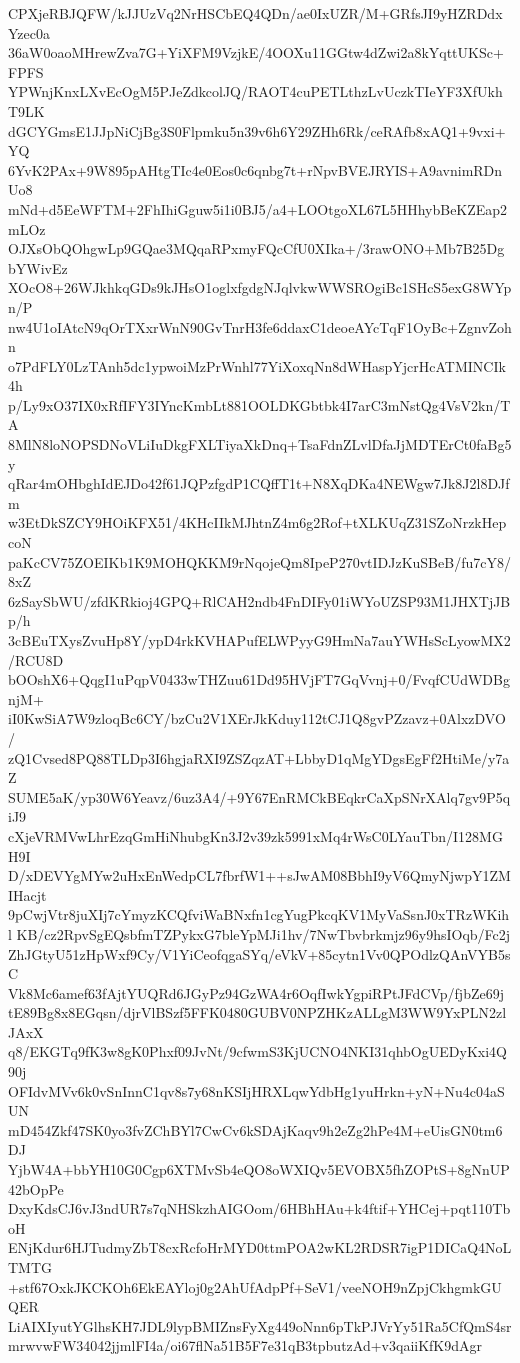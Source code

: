 CPXjeRBJQFW/kJJUzVq2NrHSCbEQ4QDn/ae0IxUZR/M+GRfsJI9yHZRDdxYzec0a
36aW0oaoMHrewZva7G+YiXFM9VzjkE/4OOXu11GGtw4dZwi2a8kYqttUKSc+FPFS
YPWnjKnxLXvEcOgM5PJeZdkcolJQ/RAOT4cuPETLthzLvUczkTIeYF3XfUkhT9LK
dGCYGmsE1JJpNiCjBg3S0Flpmku5n39v6h6Y29ZHh6Rk/ceRAfb8xAQ1+9vxi+YQ
6YvK2PAx+9W895pAHtgTIc4e0Eos0c6qnbg7t+rNpvBVEJRYIS+A9avnimRDnUo8
mNd+d5EeWFTM+2FhIhiGguw5i1i0BJ5/a4+LOOtgoXL67L5HHhybBeKZEap2mLOz
OJXsObQOhgwLp9GQae3MQqaRPxmyFQcCfU0XIka+/3rawONO+Mb7B25DgbYWivEz
XOcO8+26WJkhkqGDs9kJHsO1oglxfgdgNJqlvkwWWSROgiBc1SHcS5exG8WYpn/P
nw4U1oIAtcN9qOrTXxrWnN90GvTnrH3fe6ddaxC1deoeAYcTqF1OyBc+ZgnvZohn
o7PdFLY0LzTAnh5dc1ypwoiMzPrWnhl77YiXoxqNn8dWHaspYjcrHcATMINCIk4h
p/Ly9xO37IX0xRfIFY3IYncKmbLt881OOLDKGbtbk4I7arC3mNstQg4VsV2kn/TA
8MlN8loNOPSDNoVLiIuDkgFXLTiyaXkDnq+TsaFdnZLvlDfaJjMDTErCt0faBg5y
qRar4mOHbghIdEJDo42f61JQPzfgdP1CQffT1t+N8XqDKa4NEWgw7Jk8J2l8DJfm
w3EtDkSZCY9HOiKFX51/4KHcIIkMJhtnZ4m6g2Rof+tXLKUqZ31SZoNrzkHepcoN
paKcCV75ZOEIKb1K9MOHQKKM9rNqojeQm8IpeP270vtIDJzKuSBeB/fu7cY8/8xZ
6zSaySbWU/zfdKRkioj4GPQ+RlCAH2ndb4FnDIFy01iWYoUZSP93M1JHXTjJBp/h
3cBEuTXysZvuHp8Y/ypD4rkKVHAPufELWPyyG9HmNa7auYWHsScLyowMX2/RCU8D
bOOshX6+QqgI1uPqpV0433wTHZuu61Dd95HVjFT7GqVvnj+0/FvqfCUdWDBgnjM+
iI0KwSiA7W9zloqBc6CY/bzCu2V1XErJkKduy112tCJ1Q8gvPZzavz+0AlxzDVO/
zQ1Cvsed8PQ88TLDp3I6hgjaRXI9ZSZqzAT+LbbyD1qMgYDgsEgFf2HtiMe/y7aZ
SUME5aK/yp30W6Yeavz/6uz3A4/+9Y67EnRMCkBEqkrCaXpSNrXAlq7gv9P5qiJ9
cXjeVRMVwLhrEzqGmHiNhubgKn3J2v39zk5991xMq4rWsC0LYauTbn/I128MGH9I
D/xDEVYgMYw2uHxEnWedpCL7fbrfW1++sJwAM08BbhI9yV6QmyNjwpY1ZMIHacjt
9pCwjVtr8juXIj7cYmyzKCQfviWaBNxfn1cgYugPkcqKV1MyVaSsnJ0xTRzWKihl
KB/cz2RpvSgEQsbfmTZPykxG7bleYpMJi1hv/7NwTbvbrkmjz96y9hsIOqb/Fc2j
ZhJGtyU51zHpWxf9Cy/V1YiCeofqgaSYq/eVkV+85cytn1Vv0QPOdlzQAnVYB5sC
Vk8Mc6amef63fAjtYUQRd6JGyPz94GzWA4r6OqfIwkYgpiRPtJFdCVp/fjbZe69j
tE89Bg8x8EGqsn/djrVlBSzf5FFK0480GUBV0NPZHKzALLgM3WW9YxPLN2zlJAxX
q8/EKGTq9fK3w8gK0Phxf09JvNt/9cfwmS3KjUCNO4NKI31qhbOgUEDyKxi4Q90j
OFIdvMVv6k0vSnInnC1qv8s7y68nKSIjHRXLqwYdbHg1yuHrkn+yN+Nu4c04aSUN
mD454Zkf47SK0yo3fvZChBYl7CwCv6kSDAjKaqv9h2eZg2hPe4M+eUisGN0tm6DJ
YjbW4A+bbYH10G0Cgp6XTMvSb4eQO8oWXIQv5EVOBX5fhZOPtS+8gNnUP42bOpPe
DxyKdsCJ6vJ3ndUR7s7qNHSkzhAIGOom/6HBhHAu+k4ftif+YHCej+pqt110TboH
ENjKdur6HJTudmyZbT8cxRcfoHrMYD0ttmPOA2wKL2RDSR7igP1DICaQ4NoLTMTG
+stf67OxkJKCKOh6EkEAYloj0g2AhUfAdpPf+SeV1/veeNOH9nZpjCkhgmkGUQER
LiAIXIyutYGlhsKH7JDL9lypBMIZnsFyXg449oNnn6pTkPJVrYy51Ra5CfQmS4sr
mrwvwFW34042jjmlFI4a/oi67flNa51B5F7e31qB3tpbutzAd+v3qaiiKfK9dAgr
